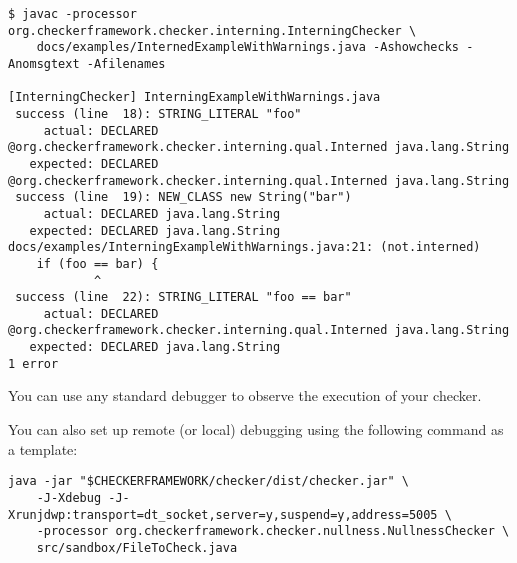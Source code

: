 \begin{smaller}
\begin{Verbatim}
$ javac -processor org.checkerframework.checker.interning.InterningChecker \
    docs/examples/InternedExampleWithWarnings.java -Ashowchecks -Anomsgtext -Afilenames

[InterningChecker] InterningExampleWithWarnings.java
 success (line  18): STRING_LITERAL "foo"
     actual: DECLARED @org.checkerframework.checker.interning.qual.Interned java.lang.String
   expected: DECLARED @org.checkerframework.checker.interning.qual.Interned java.lang.String
 success (line  19): NEW_CLASS new String("bar")
     actual: DECLARED java.lang.String
   expected: DECLARED java.lang.String
docs/examples/InterningExampleWithWarnings.java:21: (not.interned)
    if (foo == bar) {
            ^
 success (line  22): STRING_LITERAL "foo == bar"
     actual: DECLARED @org.checkerframework.checker.interning.qual.Interned java.lang.String
   expected: DECLARED java.lang.String
1 error
\end{Verbatim}
\end{smaller}


You can use any standard debugger to observe the execution of your checker.

You can also set up remote (or local) debugging using the following command as a template:

\begin{Verbatim}
java -jar "$CHECKERFRAMEWORK/checker/dist/checker.jar" \
    -J-Xdebug -J-Xrunjdwp:transport=dt_socket,server=y,suspend=y,address=5005 \
    -processor org.checkerframework.checker.nullness.NullnessChecker \
    src/sandbox/FileToCheck.java

\end{Verbatim}


